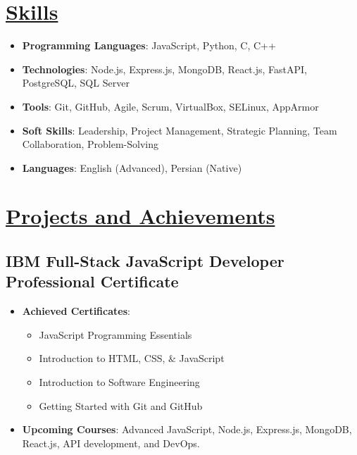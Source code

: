 \documentclass[a4paper,9pt]{article}
\newcommand{\mainsection}[1]{\underline{#1}}
\begin{document}
\section*{\mainsection{Skills}}
\begin{itemize}[leftmargin=*]
  \item \textbf{Programming Languages}: JavaScript, Python, C, C++
  \item \textbf{Technologies}: Node.js, Express.js, MongoDB, React.js, FastAPI, PostgreSQL, SQL Server
  \item \textbf{Tools}: Git, GitHub, Agile, Scrum, VirtualBox, SELinux, AppArmor
  \item \textbf{Soft Skills}: Leadership, Project Management, Strategic Planning, Team Collaboration, Problem-Solving
  \item \textbf{Languages}: English (Advanced), Persian (Native)
\end{itemize}

\section*{\mainsection{Projects and Achievements}}

\subsection*{IBM Full-Stack JavaScript Developer Professional Certificate}
\begin{multicols}{2}
\begin{itemize}[leftmargin=*]
  \item \textbf{Achieved Certificates}: 
    \begin{itemize}[leftmargin=*]
      \item JavaScript Programming Essentials
      \item Introduction to HTML, CSS, \& JavaScript
      \item Introduction to Software Engineering
      \item Getting Started with Git and GitHub\columnbreak
    \end{itemize}
  \item \textbf{Upcoming Courses}: Advanced JavaScript, Node.js, Express.js, MongoDB, React.js, API development, and DevOps.
\end{itemize}
\end{multicols}
\end{document}
